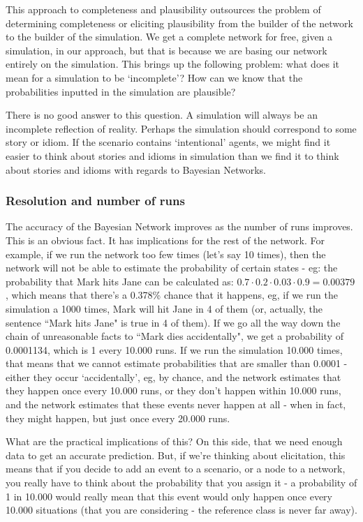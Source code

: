 This approach to completeness and plausibility outsources the problem of determining completeness or eliciting plausibility from the builder of the network to the builder of the simulation. We get a complete network for free, given a simulation, in our approach, but that is because we are basing our network entirely on the simulation. This brings up the following problem: what does it mean for a simulation to be `incomplete'? How can we know that the probabilities inputted in the simulation are plausible?

 There is no good answer to this question. A simulation will always be an incomplete reflection of reality. Perhaps the simulation should correspond to some story or idiom. If the scenario contains `intentional' agents, we might find it easier to think about stories and idioms in simulation than we find it to think about stories and idioms with regards to Bayesian Networks.



\subsubsection{Resolution and number of runs}
The accuracy of the Bayesian Network improves as the number of runs improves. This is an obvious fact. It has implications for the rest of the network. For example, if we run the network too few times (let's say 10 times), then the network will not be able to estimate the probability of certain states - eg: the probability that Mark hits Jane can be calculated as: $0.7 \cdot 0.2 \cdot 0.03 \cdot 0.9 = 0.00379$, which means that there's a 0.378\% chance that it happens, eg, if we run the simulation a 1000 times, Mark will hit Jane in 4 of them (or, actually, the sentence ``Mark hits Jane" is true in 4 of them). If we go all the way down the chain of unreasonable facts to ``Mark dies accidentally", we get a probability of 0.0001134, which is 1 every 10.000 runs. If we run the simulation 10.000 times, that means that we cannot estimate probabilities that are smaller than 0.0001 - either they occur `accidentally', eg, by chance, and the network estimates that they happen once every 10.000 runs, or they don't happen within 10.000 runs, and the network estimates that these events never happen at all - when in fact, they might happen, but just once every 20.000 runs.

What are the practical implications of this? On this side, that we need enough data to get an accurate prediction. But, if we're thinking about elicitation, this means that if you decide to add an event to a scenario, or a node to a network, you really have to think about the probability that you assign it - a probability of 1 in 10.000 would really mean that this event would only happen once every 10.000 situations (that you are considering - the reference class is never far away). 




